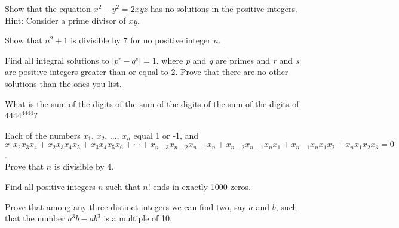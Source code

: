\documentclass{article}
\begin{document}
Show that the equation \(x^2- y^2=2x y z\) has no solutions in the positive integers. { }Hint: { }Consider a prime divisor of \(x y\).

Show that \(n^2+ 1\) is divisible by 7 for no positive integer \(n\).

Find all integral solutions to \(\left|p^r-q^s\right|=1\), where \textit{ p} and \textit{ q} are primes and \textit{ r} and \textit{ s} are positive
integers greater than or equal to 2. Prove that there are no other solutions than the ones you list.

What is the sum of the digits of the sum of the digits of the sum of the digits of \(4444^{4444}\)?

Each of the numbers \(x_1\), \(x_2\), ..., \(x_n\) equal 1 or -1, and { }\(x_1x_2x_3x_4+x_2x_3x_4x_5+x_3x_4x_5x_6+\cdots +x_{n-3}x_{n-2}x_{n-1}x_n+x_{n-2}x_{n-1}x_nx_1+x_{n-1}x_nx_1x_2+x_nx_1x_2x_3=
0\). { }\\
Prove that \(n\) is divisible by 4.

Find all positive integers \(n\) such that \(n!\) ends in exactly 1000 zeros.

Prove that among any three distinct integers we can find two, say \(a\) and \(b\), such that the number \(a^3b - a b^3\) is a multiple of 10.
\end{document}
